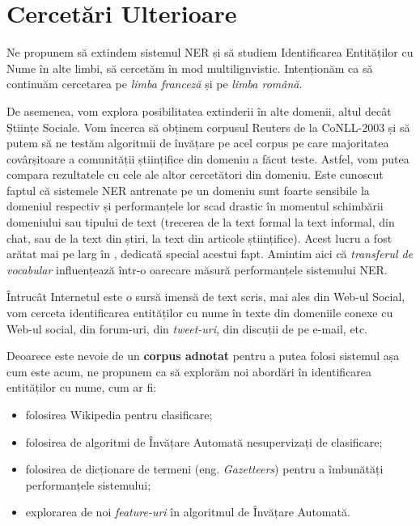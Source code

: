 \section{Cercetări Ulterioare}

Ne propunem să extindem sistemul NER și să studiem Identificarea Entităților cu Nume în alte limbi, să cercetăm în mod multilignvistic. Intenționăm ca să continuăm cercetarea pe \textit{limba franceză} și pe \textit{limba română}.

De asemenea, vom explora posibilitatea extinderii în alte domenii, altul decât Științe Sociale. Vom încerca să obținem corpusul Reuters de la CoNLL-2003 și să putem să ne testăm algoritmii de învățare pe acel corpus pe care majoritatea covârșitoare a comunității științifice din domeniu a făcut teste. Astfel, vom putea compara rezultatele cu cele ale altor cercetători din domeniu. Este cunoscut faptul că sistemele NER antrenate pe un domeniu sunt foarte sensibile la domeniul respectiv și performanțele lor scad drastic în momentul schimbării domeniului sau tipului de text (trecerea de la text formal la text informal, din chat, sau de la text din știri, la text din articole științifice). Acest lucru a fost arătat mai pe larg în , dedicată special acestui fapt. Amintim aici că \textit{transferul de vocabular} influențează într-o oarecare măsură performanțele sistemului NER.

Întrucât Internetul este o sursă imensă de text scris, mai ales din Web-ul Social, vom cerceta identificarea entităților cu nume în texte din domeniile conexe cu Web-ul social, din forum-uri, din \textit{tweet-uri}, din discuții de pe e-mail, etc.

Deoarece este nevoie de un \textbf{corpus adnotat} pentru a putea folosi sistemul așa cum este acum, ne propunem ca să explorăm noi abordări în identificarea entităților cu nume, cum ar fi:

\begin{itemize}
\item folosirea Wikipedia pentru clasificare;
\item folosirea de algoritmi de Învățare Automată nesupervizați de clasificare;
\item folosirea de dicționare de termeni (eng. \textit{Gazetteers}) pentru a îmbunătăți performanțele sistemului;
\item explorarea de noi \textit{feature-uri} în algoritmul de Învățare Automată.
\end{itemize}

